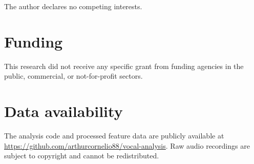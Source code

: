 \documentclass[review,3p,number]{elsarticle}
\begin{document}
The author declares no competing interests.

\section*{Funding}

This research did not receive any specific grant from funding agencies in the
public, commercial, or not-for-profit sectors.

\section*{Data availability}

The analysis code and processed feature data are publicly available at
\url{https://github.com/arthurcornelio88/vocal-analysis}. Raw audio recordings are
subject to copyright and cannot be redistributed.



\end{document}
